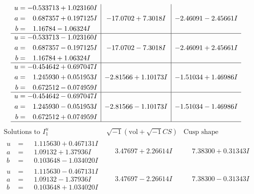 \documentclass[1p]{elsarticle_modified}
\theoremstyle{definition}
\newcommand{\I}{\sqrt{-1}}
\begin{document}
$$\begin{array}{c|c|c}
\begin{aligned}
u &= -0.533713 + 1.023160 I \\
a &= \phantom{-}0.687357 + 0.197125 I \\
b &= \phantom{-}1.16784 - 1.06324 I\end{aligned}
 & -17.0702 + 7.3018 I & -2.46091 - 2.45661 I \\ \hline\begin{aligned}
u &= -0.533713 - 1.023160 I \\
a &= \phantom{-}0.687357 - 0.197125 I \\
b &= \phantom{-}1.16784 + 1.06324 I\end{aligned}
 & -17.0702 - 7.3018 I & -2.46091 + 2.45661 I \\ \hline\begin{aligned}
u &= -0.454642 + 0.697047 I \\
a &= \phantom{-}1.245930 + 0.051953 I \\
b &= \phantom{-}0.672512 - 0.074959 I\end{aligned}
 & -2.81566 + 1.10173 I & -1.51034 + 1.46986 I \\ \hline\begin{aligned}
u &= -0.454642 - 0.697047 I \\
a &= \phantom{-}1.245930 - 0.051953 I \\
b &= \phantom{-}0.672512 + 0.074959 I\end{aligned}
 & -2.81566 - 1.10173 I & -1.51034 - 1.46986 I\\
 \hline 
 \end{array}$$\newpage$$\begin{array}{c|c|c}  
\text{Solutions to }I^u_{1}& \I (\text{vol} + \sqrt{-1}CS) & \text{Cusp shape}\\
 \hline 
\begin{aligned}
u &= \phantom{-}1.115630 + 0.467131 I \\
a &= \phantom{-}1.09132 + 1.37936 I \\
b &= \phantom{-}0.103648 - 1.034020 I\end{aligned}
 & \phantom{-}3.47697 + 2.26614 I & \phantom{-}7.38300 + 0.31343 I \\ \hline\begin{aligned}
u &= \phantom{-}1.115630 - 0.467131 I \\
a &= \phantom{-}1.09132 - 1.37936 I \\
b &= \phantom{-}0.103648 + 1.034020 I\end{aligned}
 & \phantom{-}3.47697 - 2.26614 I & \phantom{-}7.38300 - 0.31343 I \\ \hline\begin{aligned}

\end{aligned}
\end{array}$$
\end{document}
